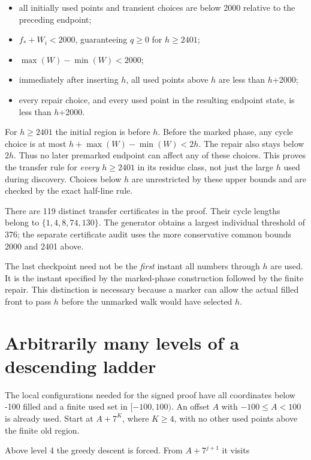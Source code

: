 \documentclass[11pt,a4paper]{article}
\begin{document}
\begin{itemize}
\item all initially used points and transient choices are below 2000 relative to the preceding endpoint;
\item $f_*+W_i<2000$, guaranteeing $q\ge0$ for $h\ge2401$;
\item $\max(W)-\min(W)<2000$;
\item immediately after inserting $h$, all used points above $h$ are less than $h$+2000;
\item every repair choice, and every used point in the resulting endpoint state, is less than $h$+2000.
\end{itemize}

For $h\ge2401$ the initial region is before $h$. Before the marked phase, any cycle choice is at most $h+\max(W)-\min(W)<2h$. The repair also stays below $2h$. Thus no later premarked endpoint can affect any of these choices. This proves the transfer rule for \emph{every} $h\ge2401$ in its residue class, not just the large $h$ used during discovery. Choices below $h$ are unrestricted by these upper bounds and are checked by the exact half-line rule.

There are 119 distinct transfer certificates in the proof. Their cycle lengths belong to $\{1,4,8,74,130\}$. The generator obtains a largest individual threshold of 376; the separate certificate audit uses the more conservative common bounds 2000 and 2401 above.

The last checkpoint need not be the \emph{first} instant all numbers through $h$ are used. It is the instant specified by the marked-phase construction followed by the finite repair. This distinction is necessary because a marker can allow the actual filled front to pass $h$ before the unmarked walk would have selected $h$.

\section{Arbitrarily many levels of a descending ladder}
\label{sec:4}

The local configurations needed for the signed proof have all coordinates below -100 filled and a finite used set in $[-100,100)$. An offset $A$ with $-100\le A<100$ is already used. Start at $A+7^K$, where $K\ge4$, with no other used points above the finite old region.

Above level 4 the greedy descent is forced. From $A+7^{j+1}$ it visits
\end{document}
